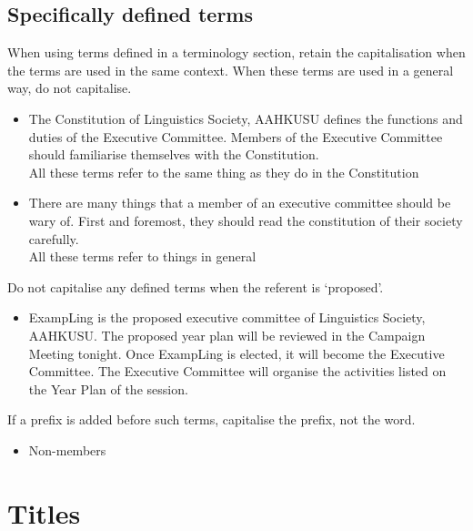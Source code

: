 \documentclass[11pt,a4paper]{book}
\newcommand{\cmark}{{\color{green(html/cssgreen)}\checkmark}}%
\begin{document}
			\subsection{Specifically defined terms}
			When using terms defined in a terminology section, retain the capitalisation when the terms are used in the same context. When these terms are used in a general way, do not capitalise.
				{\firasans \begin{mdframed}[backgroundcolor=aliceblue] \begin{itemize}[label=\cmark]
					\item The Constitution of Linguistics Society, AAHKUSU defines the functions and duties of the Executive Committee. Members of the Executive Committee should familiarise themselves with the Constitution.\\
					\lbrack All these terms refer to the same thing as they do in the Constitution\rbrack
					\item There are many things that a member of an executive committee should be wary of. First and foremost, they should read the constitution of their society carefully.\\
					\lbrack All these terms refer to things in general\rbrack
				\end{itemize} \end{mdframed} }
			Do not capitalise any defined terms when the referent is `proposed'.
				{\firasans \begin{mdframed}[backgroundcolor=aliceblue] \begin{itemize}[label=\cmark]
					\item ExampLing is the proposed executive committee of Linguistics Society, AAHKUSU. The proposed year plan will be reviewed in the Campaign Meeting tonight. Once ExampLing is elected, it will become the Executive Committee. The Executive Committee will organise the activities listed on the Year Plan of the session.
				\end{itemize} \end{mdframed} }
			If a prefix is added before such terms, capitalise the prefix, not the word.
				{\firasans \begin{mdframed}[backgroundcolor=aliceblue] \begin{itemize}[label=\cmark]
					\item Non-members
				\end{itemize} \end{mdframed} }
			\section{Titles}
\end{document}
